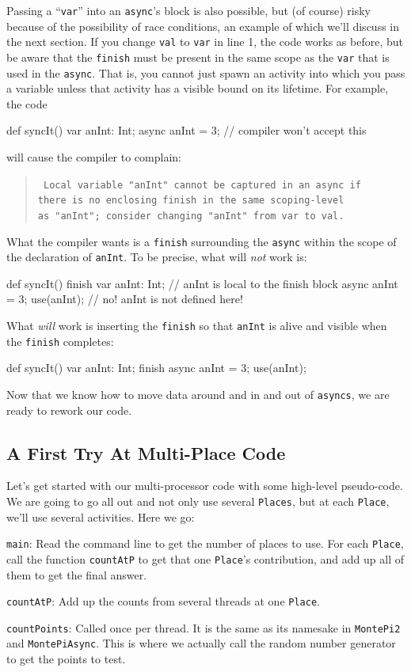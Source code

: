 Passing a ``{\tt var}'' into an {\tt async}'s block is also possible, but (of
course) risky because of the possibility of race conditions, an example of which
we'll discuss in the next section. If you change {\tt val} to {\tt var} in
line 1, the code works as before, but be aware that the {\tt finish} must be
present in the same scope as the {\tt var} that is used in the {\tt async}. 
That is, you cannot just spawn an activity into which you pass a variable 
unless that activity has a visible bound on its lifetime.  For example, the
code
\begin{xten} 
def syncIt() {
    var anInt: Int;
    async anInt = 3;  // compiler won't accept this
}
\end{xten}
will cause the compiler to complain:
\begin{quote}{\tt
Local variable "anInt" cannot be captured in an async if\\
there is no enclosing finish in the same scoping-level\\
as "anInt"; consider changing "anInt" from var to val.}
\end{quote}
What the compiler wants is a {\tt finish} surrounding the {\tt async} within the
scope of the declaration of {\tt anInt}.  To be precise, what will {\em not}
work is:
\begin{xten} 
def syncIt() {
   finish {
     var anInt: Int; // anInt is local to the finish block
     async anInt = 3;
   }
   use(anInt);  // no! anInt is not defined here!
}
\end{xten}
What {\em will} work is inserting the {\tt finish} so that {\tt anInt} is alive
and visible when the {\tt finish} completes:
\begin{xten} 
def syncIt() {
   var anInt: Int;
   finish {
     async anInt = 3;
   }
   use(anInt);
}
\end{xten}

Now that we know how to move data around and in and out of {\tt asyncs}, we are
ready to rework our code.
 
\subsection{A First Try At Multi-Place Code}\label{ssec:montepierror}
Let's get started with our multi-processor code with some high-level pseudo-code.
We are going to go all out and not only use several {\tt Places}, but at each
{\tt Place}, we'll use several activities.  Here we go:
\begin{description}\label{lbl:mpchl}
\item{\tt main}:
      Read the command line to get the number of places to use.
      For each {\tt Place}, call the function {\tt countAtP} to get
      that one {\tt Place}'s contribution, and add up all of them
      to get the final answer.
\item{\tt countAtP}:
      Add up the counts from several threads at one {\tt Place}. 
\item{\tt countPoints}:
      Called once per thread.  It is the same as its namesake in
      {\tt MontePi2} and {\tt MontePiAsync}.  This is where we actually call
      the random number generator to get the points to test.
\end{description}

